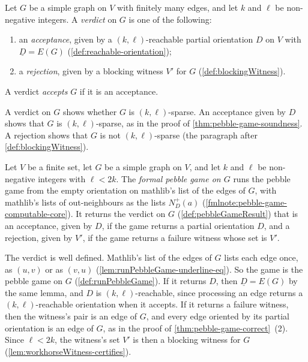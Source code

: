 \begin{definition}[Verdict]
  \label{def:pebbleGameResult}
  \leanok
  Let $G$ be a simple graph on $V$ with finitely many edges, and let
  $k$ and $\ell$ be non-negative integers. A \emph{verdict} on $G$ is
  one of the following:
  \begin{enumerate}
    \item an \emph{acceptance}, given by a $(k, \ell)$-reachable partial
      orientation $D$ on $V$ with $\underline{D} = E(G)$
      (\cref{def:reachable-orientation});
    \item a \emph{rejection}, given by a blocking witness $V'$ for $G$
      (\cref{def:blockingWitness}).
  \end{enumerate}
  A verdict \emph{accepts} $G$ if it is an acceptance.
\end{definition}

A verdict on $G$ shows whether $G$ is $(k, \ell)$-sparse. An acceptance
given by $D$ shows that $G$ is $(k, \ell)$-sparse, as in the proof of
\cref{thm:pebble-game-soundness}. A rejection shows that $G$ is not
$(k, \ell)$-sparse (the paragraph after \cref{def:blockingWitness}).

\begin{definition}
  \label{def:runPebbleGame-verdict}
  \leanok
  Let $V$ be a finite set, let $G$ be a simple graph on $V$, and let $k$
  and $\ell$ be non-negative integers with $\ell < 2k$. The
  \emph{formal pebble game on $G$} runs the pebble game from the empty
  orientation on mathlib's list of the edges of $G$, with mathlib's
  lists of out-neighbours as the lists $N^+_D(a)$
  (\cref{fmlnote:pebble-game-computable-core}). It returns the verdict
  on $G$ (\cref{def:pebbleGameResult}) that is an acceptance, given by
  $D$, if the game returns a partial orientation $D$, and a rejection,
  given by $V'$, if the game returns a failure witness whose set is
  $V'$.
\end{definition}

The verdict is well defined. Mathlib's list of the edges of $G$ lists
each edge once, as $(u, v)$ or as $(v, u)$
(\cref{lem:runPebbleGame-underline-eq}). So the game is the pebble game
on $G$ (\cref{def:runPebbleGame}). If it returns $D$, then
$\underline{D} = E(G)$ by the same lemma, and $D$ is
$(k, \ell)$-reachable, since processing an edge returns a
$(k, \ell)$-reachable orientation when it accepts. If it returns a
failure witness, then the witness's pair is an edge of $G$, and every
edge oriented by its partial orientation is an edge of $G$, as in the
proof of \cref{thm:pebble-game-correct}~(2). Since $\ell < 2k$, the
witness's set $V'$ is then a blocking witness for $G$
(\cref{lem:workhorseWitness-certifies}).

